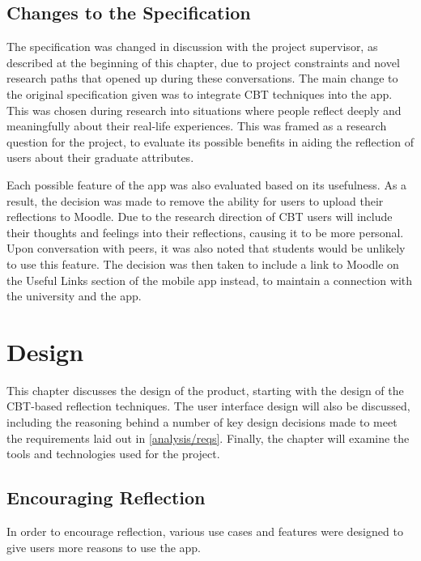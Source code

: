 \documentclass{l4proj}
\begin{document}
\section{Changes to the Specification}

The specification was changed in discussion with the project supervisor, as described at the beginning of this chapter, due to project constraints and novel research paths that opened up during these conversations. The main change to the original specification given was to integrate CBT techniques into the app. This was chosen during research into situations where people reflect deeply and meaningfully about their real-life experiences. This was framed as a research question for the project, to evaluate its possible benefits in aiding the reflection of users about their graduate attributes. 

Each possible feature of the app was also evaluated based on its usefulness. As a result, the decision was made to remove the ability for users to upload their reflections to Moodle. Due to the research direction of CBT users will include their thoughts and feelings into their reflections, causing it to be more personal. Upon conversation with peers, it was also noted that students would be unlikely to use this feature. The decision was then taken to include a link to Moodle on the Useful Links section of the mobile app instead, to maintain a connection with the university and the app.


\chapter{Design}

This chapter discusses the design of the product, starting with the design of the CBT-based reflection techniques. The user interface design will also be discussed, including the reasoning behind a number of key design decisions made to meet the requirements laid out in \ref{analysis/reqs}. Finally, the chapter will examine the tools and technologies used for the project. 

\section{Encouraging Reflection}

In order to encourage reflection, various use cases and features were designed to give users more reasons to use the app.
\end{document}
